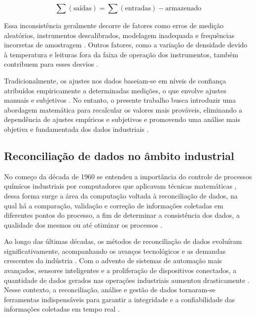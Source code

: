 \begin{equation}
	\sum (\text{saídas}) = \sum (\text{entradas}) - \text{armazenado}
\end{equation}

Essa inconsistência geralmente decorre de fatores como erros de medição aleatórios, instrumentos descalibrados, modelagem inadequada e frequências incorretas de amostragem \cite{measurementerror2020}. Outros fatores, como a variação de densidade devido à temperatura e leituras fora da faixa de operação dos instrumentos, também contribuem para esses desvios \cite{temperaturedensity2022}.

Tradicionalmente, os ajustes nos dados baseiam-se em níveis de confiança atribuídos empiricamente a determinadas medições, o que envolve ajustes manuais e subjetivos \cite{empiricaladjustment2023}. No entanto, o presente trabalho busca introduzir uma abordagem matemática para recalcular os valores mais prováveis, eliminando a dependência de ajustes empíricos e subjetivos e promovendo uma análise mais objetiva e fundamentada dos dados industriais \cite{mathematicalapproach2024}.

\subsection{Reconciliação de dados no âmbito industrial}

No começo da década de 1960 se entendeu a importância do controle de processos químicos industriais por computadores que aplicavam técnicas matemáticas \cite{computecontrol}, dessa forma surge a área da computação voltada à reconciliação de dados, na qual há a comparação, validação e correção de informações coletadas em diferentes pontos do processo, a fim de determinar a consistência dos dados, a qualidade dos mesmos ou até otimizar os processos \cite{datarecshakar}.

Ao longo das últimas décadas, os métodos de reconciliação de dados evoluíram significativamente, acompanhando os avanços tecnológicos e as demandas crescentes da indústria \cite{datarecsurvey}. Com o advento de sistemas de automação mais avançados, sensores inteligentes e a proliferação de dispositivos conectados, a quantidade de dados gerados nas operações industriais aumentou drasticamente \cite{datarecsurvey}. Nesse contexto, a reconciliação, análise e gestão de dados tornaram-se ferramentas indispensáveis para garantir a integridade e a confiabilidade das informações coletadas em tempo real \cite{aularecon}.

